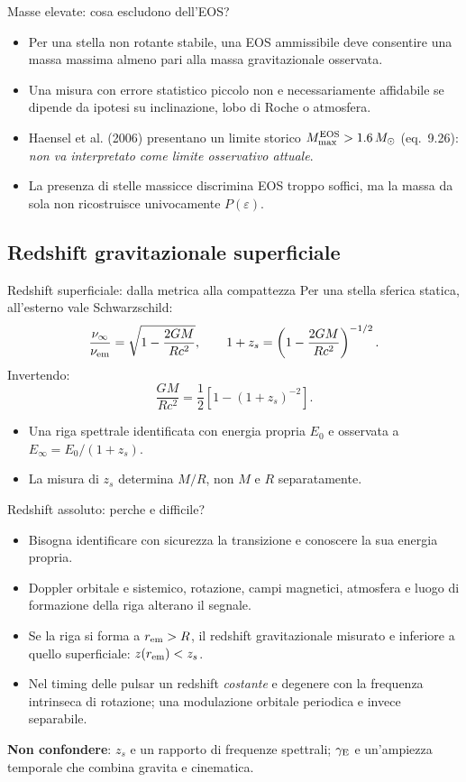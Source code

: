 \begin{frame}[t]{Masse elevate: cosa escludono dell'EOS?}
\small
\begin{itemize}
\item Per una stella non rotante stabile, una EOS ammissibile deve consentire una massa massima almeno pari alla massa gravitazionale osservata.
\item Una misura con errore statistico piccolo non e necessariamente affidabile se dipende da ipotesi su inclinazione, lobo di Roche o atmosfera.
\item Haensel et al. (2006) presentano un limite storico $M_{\max}^{\rm EOS}>1.6\,M_\odot$ (eq.~9.26): \emph{non va interpretato come limite osservativo attuale}.
\item La presenza di stelle massicce discrimina EOS troppo soffici, ma la massa da sola non ricostruisce univocamente $P(\varepsilon)$.
\end{itemize}
\end{frame}

\subsection{Redshift gravitazionale superficiale}

\begin{frame}[t]{Redshift superficiale: dalla metrica alla compattezza}
\small
Per una stella sferica statica, all'esterno vale Schwarzschild:
\[
\frac{\nu_\infty}{\nu_{\rm em}}=\sqrt{1-\frac{2GM}{Rc^2}},\qquad
1+z_s=\left(1-\frac{2GM}{Rc^2}\right)^{-1/2}.
\]
Invertendo:
\[
\boxed{\frac{GM}{Rc^2}=\frac12\left[1-(1+z_s)^{-2}\right]}.
\]
\begin{itemize}
\item Una riga spettrale identificata con energia propria $E_0$ e osservata a $E_\infty=E_0/(1+z_s)$.
\item La misura di $z_s$ determina $M/R$, non $M$ e $R$ separatamente.
\end{itemize}
\end{frame}

\begin{frame}[t]{Redshift assoluto: perche e difficile?}
\small
\begin{itemize}
\item Bisogna identificare con sicurezza la transizione e conoscere la sua energia propria.
\item Doppler orbitale e sistemico, rotazione, campi magnetici, atmosfera e luogo di formazione della riga alterano il segnale.
\item Se la riga si forma a $r_{\rm em}>R$, il redshift gravitazionale misurato e inferiore a quello superficiale: $z(r_{\rm em})<z_s$.
\item Nel timing delle pulsar un redshift \emph{costante} e degenere con la frequenza intrinseca di rotazione; una modulazione orbitale periodica e invece separabile.
\end{itemize}
\medskip
\textbf{Non confondere}: $z_s$ e un rapporto di frequenze spettrali; $\gamma_{\rm E}$ e un'ampiezza temporale che combina gravita e cinematica.
\end{frame}

